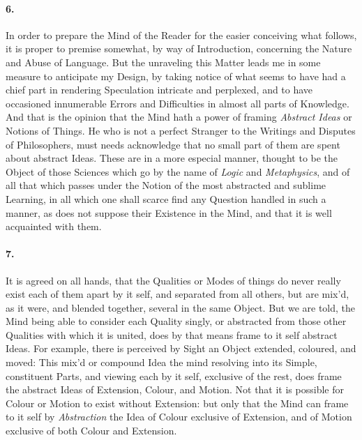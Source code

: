 \documentclass[]{article}
\newenvironment{sectionbody}{\begin{multicols}{2}}{\end{multicols}}
\begin{document}
\begin{sectionbody}
\paragraph{6.} In order to prepare the Mind of the Reader for the easier
conceiving what follows, it is proper to premise somewhat, by way
of Introduction, concerning the Nature and Abuse of Language.
But the unraveling this Matter leads me in some measure to
anticipate my Design, by taking notice of what seems to have had
a chief part in rendering Speculation intricate and perplexed,
and to have occasioned innumerable Errors and Difficulties in
almost all parts of Knowledge.  And that is the opinion that the
Mind hath a power of framing \emph{Abstract Ideas} or Notions
of Things.  He who is not a perfect Stranger to the Writings and
Disputes of Philosophers, must needs acknowledge that no small
part of them are spent about abstract Ideas.  These are in a more
especial manner, thought to be the Object of those Sciences which
go by the name of \emph{Logic} and \emph{Metaphysics}, and of
all that which passes under the Notion of the most abstracted and
sublime Learning, in all which one shall scarce find any Question
handled in such a manner, as does not suppose their Existence in
the Mind, and that it is well acquainted with them.



\paragraph{7.} It is agreed on all hands, that the Qualities or Modes of things
do never really exist each of them apart by it self, and
separated from all others, but are mix'd, as it were, and blended
together, several in the same Object.  But we are told, the Mind
being able to consider each Quality singly, or abstracted from
those other Qualities with which it is united, does by that means
frame to it self abstract Ideas.  For example, there is perceived
by Sight an Object extended, coloured, and moved: This mix'd or
compound Idea the mind resolving into its Simple, constituent
Parts, and viewing each by it self, exclusive of the rest, does
frame the abstract Ideas of Extension, Colour, and Motion.  Not
that it is possible for Colour or Motion to exist without
Extension: but only that the Mind can frame to it self by
\emph{Abstraction} the Idea of Colour exclusive of Extension,
and of Motion exclusive of both Colour and Extension.




\end{sectionbody}
\end{document}
